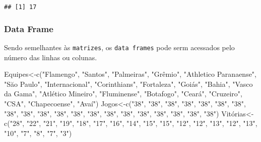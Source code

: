 \documentclass[
]{book}
\newenvironment{Shaded}{\begin{snugshade}}{\end{snugshade}}
\newcommand{\FunctionTok}[1]{\textcolor[rgb]{0.00,0.00,0.00}{#1}}
\newcommand{\NormalTok}[1]{#1}
\newcommand{\OtherTok}[1]{\textcolor[rgb]{0.56,0.35,0.01}{#1}}
\newcommand{\StringTok}[1]{\textcolor[rgb]{0.31,0.60,0.02}{#1}}
\begin{document}
\begin{verbatim}
## [1] 17
\end{verbatim}

\hypertarget{data-frame-1}{%
\subsubsection{Data Frame}\label{data-frame-1}}

Sendo semelhantes às \texttt{matrizes}, os \texttt{data\ frames} pode serm acessados pelo número das linhas ou colunas.

\begin{Shaded}
\begin{Highlighting}[]
\NormalTok{Equipes}\OtherTok{\textless{}{-}}\FunctionTok{c}\NormalTok{(}\StringTok{"Flamengo"}\NormalTok{,  }\StringTok{"Santos"}\NormalTok{,   }\StringTok{"Palmeiras"}\NormalTok{,    }\StringTok{"Grêmio"}\NormalTok{,   }\StringTok{"Athletico Paranaense"}\NormalTok{, }\StringTok{"Săo Paulo"}\NormalTok{,    }\StringTok{"Internacional"}\NormalTok{,    }\StringTok{"Corinthians"}\NormalTok{,  }\StringTok{"Fortaleza"}\NormalTok{,    }\StringTok{"Goiás"}\NormalTok{,    }\StringTok{"Bahia"}\NormalTok{,    }\StringTok{"Vasco da Gama"}\NormalTok{,    }\StringTok{"Atlético Mineiro"}\NormalTok{, }\StringTok{"Fluminense"}\NormalTok{,   }\StringTok{"Botafogo"}\NormalTok{, }\StringTok{"Ceará"}\NormalTok{,    }\StringTok{"Cruzeiro"}\NormalTok{, }\StringTok{"CSA"}\NormalTok{,  }\StringTok{"Chapecoense"}\NormalTok{,  }\StringTok{"Avaí"}\NormalTok{)}
\NormalTok{Jogos}\OtherTok{\textless{}{-}}\FunctionTok{c}\NormalTok{(}\StringTok{"38"}\NormalTok{,  }\StringTok{"38"}\NormalTok{,   }\StringTok{"38"}\NormalTok{,   }\StringTok{"38"}\NormalTok{,   }\StringTok{"38"}\NormalTok{,   }\StringTok{"38"}\NormalTok{,   }\StringTok{"38"}\NormalTok{,   }\StringTok{"38"}\NormalTok{,   }\StringTok{"38"}\NormalTok{,   }\StringTok{"38"}\NormalTok{,   }\StringTok{"38"}\NormalTok{,   }\StringTok{"38"}\NormalTok{,   }\StringTok{"38"}\NormalTok{,   }\StringTok{"38"}\NormalTok{,   }\StringTok{"38"}\NormalTok{,   }\StringTok{"38"}\NormalTok{,   }\StringTok{"38"}\NormalTok{,   }\StringTok{"38"}\NormalTok{,   }\StringTok{"38"}\NormalTok{,   }\StringTok{"38"}\NormalTok{)}
\NormalTok{Vitórias}\OtherTok{\textless{}{-}}\FunctionTok{c}\NormalTok{(}\StringTok{"28"}\NormalTok{,   }\StringTok{"22"}\NormalTok{,   }\StringTok{"21"}\NormalTok{,   }\StringTok{"19"}\NormalTok{,   }\StringTok{"18"}\NormalTok{,   }\StringTok{"17"}\NormalTok{,   }\StringTok{"16"}\NormalTok{,   }\StringTok{"14"}\NormalTok{,   }\StringTok{"15"}\NormalTok{,   }\StringTok{"15"}\NormalTok{,   }\StringTok{"12"}\NormalTok{,   }\StringTok{"12"}\NormalTok{,   }\StringTok{"13"}\NormalTok{,   }\StringTok{"12"}\NormalTok{,   }\StringTok{"13"}\NormalTok{,   }\StringTok{"10"}\NormalTok{,   }\StringTok{"7"}\NormalTok{,    }\StringTok{"8"}\NormalTok{,    }\StringTok{"7"}\NormalTok{,    }\StringTok{"3"}\NormalTok{)}

\end{Highlighting}
\end{Shaded}
\end{document}
